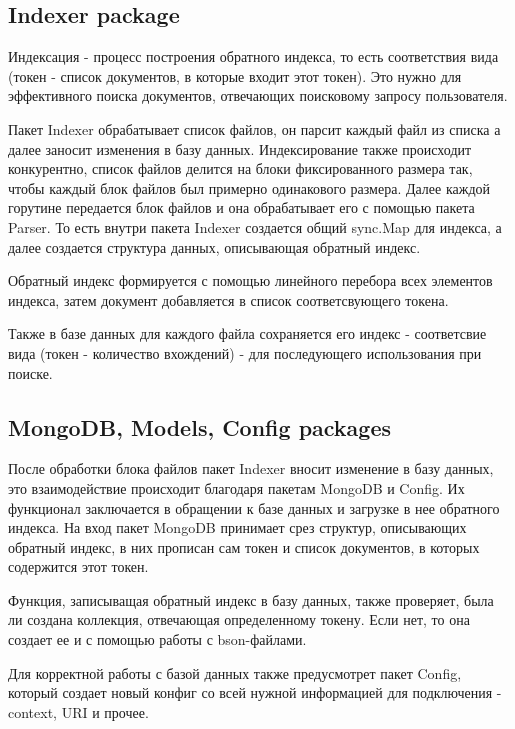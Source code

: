 \subsection{Indexer package}
Индексация - процесс построения обратного индекса, то есть соответствия вида 
(токен - список документов, в которые входит этот токен). Это нужно для 
эффективного поиска документов, отвечающих поисковому запросу пользователя.
\par
Пакет Indexer обрабатывает список файлов, он парсит каждый файл из списка а далее заносит
изменения в базу данных. Индексирование также происходит конкурентно, список файлов делится 
на блоки фиксированного размера так, чтобы каждый блок файлов был примерно одинакового
размера. Далее каждой горутине передается блок файлов и она обрабатывает его с помощью 
пакета Parser. То есть внутри пакета Indexer создается общий sync.Map для индекса, а далее 
создается структура данных, описывающая обратный индекс.
\par
Обратный индекс формируется с помощью линейного перебора всех элементов индекса, затем документ 
добавляется в список  соответсвующего токена. 
\par
Также в базе данных для каждого файла сохраняется его индекс - соответсвие вида (токен - количество вхождений) - 
для последующего использования при поиске. 

\subsection{MongoDB, Models, Config packages}
После обработки блока файлов пакет Indexer вносит изменение в базу данных, 
это взаимодействие происходит благодаря пакетам MongoDB и Config. Их 
функционал заключается в обращении к базе данных и загрузке в нее 
обратного индекса. На вход пакет MongoDB принимает срез структур, описывающих 
обратный индекс, в них прописан сам токен и список документов, в которых содержится 
этот токен. 
\par
Функция, записыващая обратный индекс в базу данных, также проверяет, была ли создана 
коллекция, отвечающая определенному токену. Если нет, то она создает ее и с помощью 
работы с bson-файлами. 
\par
Для корректной работы с базой данных также предусмотрет пакет Config, 
который создает новый конфиг со всей нужной информацией для подключения - 
context, URI и прочее. 